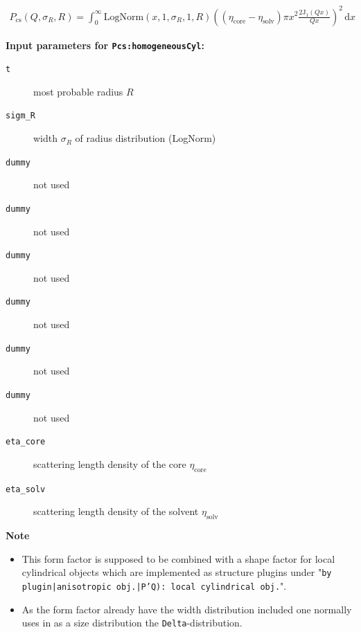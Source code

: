\begin{align}
P_\text{cs}(Q,\sigma_{R},R) = \int_0^\infty \textrm{LogNorm}(x,1,\sigma_{R},1,R) \left( \left(\eta_\textrm{core}-\eta_\textrm{solv}\right) \pi x^2 \frac{2 \mathrm{J}_1(Qx)}{Qx} \right)^2 \, \textrm{d}x
\end{align}

\noindent
\textbf{Input parameters for \texttt{Pcs:homogeneousCyl}:}
\begin{description}
    \item[\texttt{t}] most probable radius $R$
    \item[\texttt{sigm\_R}] width $\sigma_R$ of radius distribution (LogNorm)
    \item[\texttt{dummy}] not used
    \item[\texttt{dummy}] not used
    \item[\texttt{dummy}] not used
    \item[\texttt{dummy}] not used
    \item[\texttt{dummy}] not used
    \item[\texttt{dummy}] not used
    \item[\texttt{eta\_core}] scattering length density of the core $\eta_\textrm{core}$
    \item[\texttt{eta\_solv}] scattering length density of the solvent $\eta_\textrm{solv}$
\end{description}

\noindent
\textbf{Note}
\begin{itemize}
  \item This form factor is supposed to be combined with a shape factor for
local cylindrical objects which are implemented as structure  plugins
under "\texttt{by plugin|anisotropic obj.|P'Q): local cylindrical obj.}".
\item As the form factor already have the width distribution included one normally uses in \SASfit as a size distribution
the \texttt{Delta}-distribution.
\end{itemize}

